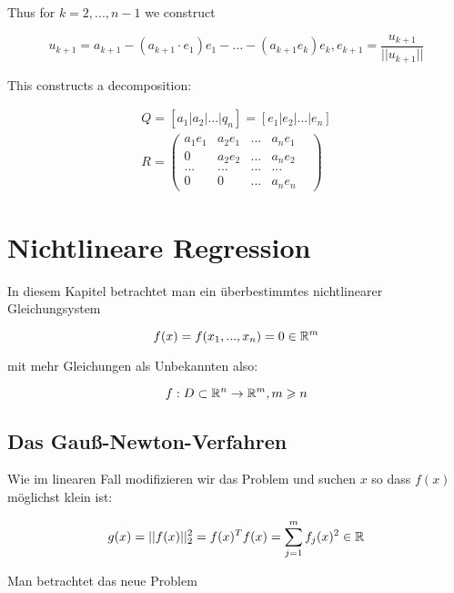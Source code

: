 \documentclass{report}
\begin{document}
Thus for $k=2,...,n-1$ we construct

\begin{equation}
    u_{k+1} = a_{k+1} - (a_{k+1}\cdot e_1)e_1 - ... - (a_{k+1}e_k)e_k, e_{k+1} = \frac{u_{k+1}}{||u_{k+1}||}
\end{equation}

This constructs a decomposition:

\begin{align}
    Q= [a_1 | a_2 |... |q_n] = [e_1 | e_2 | ... | e_n] \\
    R = \begin{pmatrix} a_1 e_1 & a_2 e_1 & ... & a_n e_1 \\
         0 & a_2 e_2 & ... & a_n e_2 \\
         ... & ... & ...& ... & \\
     0 & 0 & ... & a_n e_n \end{pmatrix}
\end{align}


\section{Nichtlineare Regression} %
\label{sec:nichtlineare_regression}

In diesem Kapitel betrachtet man ein überbestimmtes nichtlinearer Gleichungsystem

\begin{equation}
    f(x) = f(x_1,...,x_n) = 0 \in \RR^m 
\end{equation}

mit mehr Gleichungen als Unbekannten also:

\begin{equation}
    f: D \subset \RR^n \to \RR^m , m \geq n
\end{equation}

\subsection{Das Gauß-Newton-Verfahren} %
\label{sub:das_gauß_newton_verfahren}


Wie im linearen Fall modifizieren wir das Problem und suchen $x$ so dass $f(x)$ möglichst klein ist:

\begin{equation}
    g(x) = ||f(x)||_2^2 = f(x)^Tf(x) = \sum_{j=1}^m f_j(x)^2 \in \RR
\end{equation}

Man betrachtet das neue Problem
\end{document}

